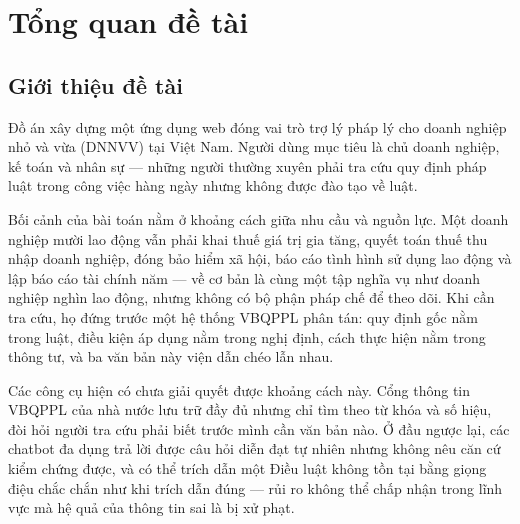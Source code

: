\documentclass[12pt,a4paper]{report}
\numberwithin{equation}{chapter}
\numberwithin{figure}{chapter}
\numberwithin{table}{chapter}
\begin{document}
\clearpage

{}
\listoffigures
\clearpage

{}
\listoftables
\clearpage

\setcounter{page}{1}

\chapter{Tổng quan đề tài}

\section{Giới thiệu đề tài}
Đồ án xây dựng một ứng dụng web đóng vai trò trợ lý pháp lý cho doanh nghiệp nhỏ
và vừa (DNNVV) tại Việt Nam. Người dùng mục tiêu là chủ doanh nghiệp, kế toán và
nhân sự --- những người thường xuyên phải tra cứu quy định pháp luật trong công
việc hàng ngày nhưng không được đào tạo về luật.

Bối cảnh của bài toán nằm ở khoảng cách giữa nhu cầu và nguồn lực. Một doanh
nghiệp mười lao động vẫn phải khai thuế giá trị gia tăng, quyết toán thuế thu
nhập doanh nghiệp, đóng bảo hiểm xã hội, báo cáo tình hình sử dụng lao động và
lập báo cáo tài chính năm --- về cơ bản là cùng một tập nghĩa vụ như doanh nghiệp
nghìn lao động, nhưng không có bộ phận pháp chế để theo dõi. Khi cần tra cứu, họ
đứng trước một hệ thống VBQPPL phân tán: quy định gốc nằm trong luật, điều kiện
áp dụng nằm trong nghị định, cách thực hiện nằm trong thông tư, và ba văn bản này
viện dẫn chéo lẫn nhau.

Các công cụ hiện có chưa giải quyết được khoảng cách này. Cổng thông tin VBQPPL
của nhà nước lưu trữ đầy đủ nhưng chỉ tìm theo từ khóa và số hiệu, đòi hỏi người
tra cứu phải biết trước mình cần văn bản nào. Ở đầu ngược lại, các chatbot đa
dụng trả lời được câu hỏi diễn đạt tự nhiên nhưng không nêu căn cứ kiểm chứng
được, và có thể trích dẫn một Điều luật không tồn tại bằng giọng điệu chắc chắn
như khi trích dẫn đúng --- rủi ro không thể chấp nhận trong lĩnh vực mà hệ quả
của thông tin sai là bị xử phạt.
\end{document}
